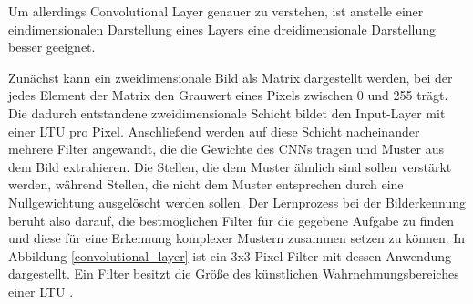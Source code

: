 Um allerdings Convolutional Layer genauer zu verstehen, ist anstelle einer eindimensionalen Darstellung eines Layers eine dreidimensionale Darstellung besser geeignet.

Zunächst kann ein zweidimensionale Bild als Matrix dargestellt werden, bei der jedes Element der Matrix den Grauwert eines Pixels zwischen 0 und 255 trägt. Die dadurch entstandene zweidimensionale Schicht bildet den Input-Layer mit einer LTU pro Pixel. Anschließend werden auf diese Schicht nacheinander mehrere Filter angewandt, die die Gewichte des CNNs tragen und Muster aus dem Bild extrahieren. Die Stellen, die dem Muster ähnlich sind sollen verstärkt werden, während Stellen, die nicht dem Muster entsprechen durch eine Nullgewichtung ausgelöscht werden sollen. Der Lernprozess bei der Bilderkennung beruht also darauf, die bestmöglichen Filter für die gegebene Aufgabe zu finden und diese für eine Erkennung komplexer Mustern zusammen setzen zu können. In Abbildung \ref{convolutional_layer} ist ein 3x3 Pixel Filter mit dessen Anwendung dargestellt. Ein Filter besitzt die Größe des künstlichen Wahrnehmungsbereiches einer LTU \cite{AurelienGeron.2018}.


